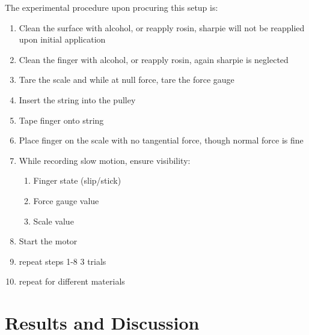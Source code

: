 \documentclass[12pt]{article}
\begin{document}
The experimental procedure upon procuring this setup is:
\begin{enumerate}
    \item Clean the surface with alcohol, or reapply rosin, sharpie will not be reapplied upon initial application
    \item Clean the finger with alcohol, or reapply rosin, again sharpie is neglected
    \item Tare the scale and while at null force, tare the force gauge
    \item Insert the string into the pulley
    \item Tape finger onto string
    \item Place finger on the scale with no tangential force, though normal force is fine
    \item While recording slow motion, ensure visibility:
    \begin{enumerate}
        \item Finger state (slip/stick)
        \item Force gauge value
        \item Scale value
    \end{enumerate}
    \item Start the motor
    \item repeat steps 1-8 3 trials
    \item repeat for different materials
\end{enumerate}

\section{Results and Discussion}
\end{document}
